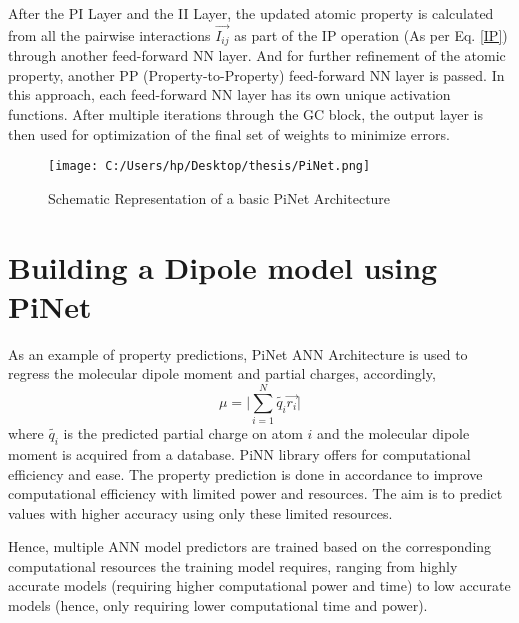 \documentclass[11pt,a4paper]{report}
\begin{document}
{After the PI Layer and the II Layer, the updated atomic property is calculated from all the pairwise interactions $\vec{I_{ij}}$ as part of the IP operation (As per Eq. \ref{IP}) through another feed-forward NN layer. And for further refinement of the atomic property, another PP (Property-to-Property) feed-forward NN layer is passed. In this approach, each feed-forward NN layer has its own unique activation functions. After multiple iterations through the GC block, the output layer is then used for optimization of the final set of weights to minimize errors.
\begin{figure} [H]
\centering
\texttt{[image: C:/Users/hp/Desktop/thesis/PiNet.png]}
\caption{Schematic Representation of a basic PiNet Architecture}
\label{PiNet}
\end{figure}

\section{Building a Dipole model using PiNet}
As an example of property predictions, PiNet ANN Architecture is used to regress the molecular dipole moment and partial charges,  accordingly,
\begin{equation} \label{dipoleeq}
\mu=\Bigg|\sum_{i=1}^{N}{\tilde{q_i}\vec{r_i}}\Bigg|
\end{equation}
where $\tilde{q_i}$ is the predicted partial charge on atom $i$ and the molecular dipole moment is acquired from a database. PiNN library offers for computational efficiency and ease. The property prediction is done in accordance to improve computational efficiency with limited power and resources. The aim is to predict values with higher accuracy using only these limited resources. 

Hence, multiple ANN model predictors are trained based on the corresponding computational resources the training model requires, ranging from highly accurate models (requiring higher computational power and time) to low accurate models (hence, only requiring lower computational time and power). 

}
\end{document}
